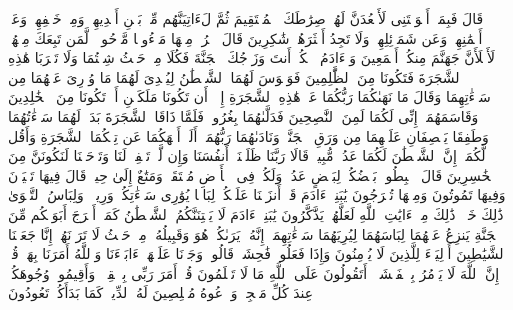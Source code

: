 \startbuffer[\q:7:16]
قَالَ فَبِمَاۤ أَغۡوَیۡتَنِی لَأَقۡعُدَنَّ لَهُمۡ صِرَٰطَكَ ٱلۡمُسۡتَقِیمَ%
\stopbuffer%
\startbuffer[\q:7:17]
ثُمَّ لَءَاتِیَنَّهُم مِّنۢ بَیۡنِ أَیۡدِیهِمۡ وَمِنۡ خَلۡفِهِمۡ وَعَنۡ أَیۡمَٰنِهِمۡ وَعَن شَمَاۤئِلِهِمۡۖ وَلَا تَجِدُ أَكۡثَرَهُمۡ شَٰكِرِینَ%
\stopbuffer%
\startbuffer[\q:7:18]
قَالَ ٱخۡرُجۡ مِنۡهَا مَذۡءُومࣰا مَّدۡحُورࣰاۖ لَّمَن تَبِعَكَ مِنۡهُمۡ لَأَمۡلَأَنَّ جَهَنَّمَ مِنكُمۡ أَجۡمَعِینَ%
\stopbuffer%
\startbuffer[\q:7:19]
وَیَٰۤءَادَمُ ٱسۡكُنۡ أَنتَ وَزَوۡجُكَ ٱلۡجَنَّةَ فَكُلَا مِنۡ حَیۡثُ شِئۡتُمَا وَلَا تَقۡرَبَا هَٰذِهِ ٱلشَّجَرَةَ فَتَكُونَا مِنَ ٱلظَّٰلِمِینَ%
\stopbuffer%
\startbuffer[\q:7:20]
فَوَسۡوَسَ لَهُمَا ٱلشَّیۡطَٰنُ لِیُبۡدِیَ لَهُمَا مَا وُۥرِیَ عَنۡهُمَا مِن سَوۡءَٰتِهِمَا وَقَالَ مَا نَهَىٰكُمَا رَبُّكُمَا عَنۡ هَٰذِهِ ٱلشَّجَرَةِ إِلَّاۤ أَن تَكُونَا مَلَكَیۡنِ أَوۡ تَكُونَا مِنَ ٱلۡخَٰلِدِینَ%
\stopbuffer%
\startbuffer[\q:7:21]
وَقَاسَمَهُمَاۤ إِنِّی لَكُمَا لَمِنَ ٱلنَّٰصِحِینَ%
\stopbuffer%
\startbuffer[\q:7:22]
فَدَلَّىٰهُمَا بِغُرُورࣲۚ فَلَمَّا ذَاقَا ٱلشَّجَرَةَ بَدَتۡ لَهُمَا سَوۡءَٰتُهُمَا وَطَفِقَا یَخۡصِفَانِ عَلَیۡهِمَا مِن وَرَقِ ٱلۡجَنَّةِۖ وَنَادَىٰهُمَا رَبُّهُمَاۤ أَلَمۡ أَنۡهَكُمَا عَن تِلۡكُمَا ٱلشَّجَرَةِ وَأَقُل لَّكُمَاۤ إِنَّ ٱلشَّیۡطَٰنَ لَكُمَا عَدُوࣱّ مُّبِینࣱ%
\stopbuffer%
\startbuffer[\q:7:23]
قَالَا رَبَّنَا ظَلَمۡنَاۤ أَنفُسَنَا وَإِن لَّمۡ تَغۡفِرۡ لَنَا وَتَرۡحَمۡنَا لَنَكُونَنَّ مِنَ ٱلۡخَٰسِرِینَ%
\stopbuffer%
\startbuffer[\q:7:24]
قَالَ ٱهۡبِطُوا۟ بَعۡضُكُمۡ لِبَعۡضٍ عَدُوࣱّۖ وَلَكُمۡ فِی ٱلۡأَرۡضِ مُسۡتَقَرࣱّ وَمَتَٰعٌ إِلَىٰ حِینࣲ%
\stopbuffer%
\startbuffer[\q:7:25]
قَالَ فِیهَا تَحۡیَوۡنَ وَفِیهَا تَمُوتُونَ وَمِنۡهَا تُخۡرَجُونَ%
\stopbuffer%
\startbuffer[\q:7:26]
یَٰبَنِیۤ ءَادَمَ قَدۡ أَنزَلۡنَا عَلَیۡكُمۡ لِبَاسࣰا یُوَٰرِی سَوۡءَٰتِكُمۡ وَرِیشࣰاۖ وَلِبَاسُ ٱلتَّقۡوَىٰ ذَٰلِكَ خَیۡرࣱۚ ذَٰلِكَ مِنۡ ءَایَٰتِ ٱللَّهِ لَعَلَّهُمۡ یَذَّكَّرُونَ%
\stopbuffer%
\startbuffer[\q:7:27]
یَٰبَنِیۤ ءَادَمَ لَا یَفۡتِنَنَّكُمُ ٱلشَّیۡطَٰنُ كَمَاۤ أَخۡرَجَ أَبَوَیۡكُم مِّنَ ٱلۡجَنَّةِ یَنزِعُ عَنۡهُمَا لِبَاسَهُمَا لِیُرِیَهُمَا سَوۡءَٰتِهِمَاۤۚ إِنَّهُۥ یَرَىٰكُمۡ هُوَ وَقَبِیلُهُۥ مِنۡ حَیۡثُ لَا تَرَوۡنَهُمۡۗ إِنَّا جَعَلۡنَا ٱلشَّیَٰطِینَ أَوۡلِیَاۤءَ لِلَّذِینَ لَا یُؤۡمِنُونَ%
\stopbuffer%
\startbuffer[\q:7:28]
وَإِذَا فَعَلُوا۟ فَٰحِشَةࣰ قَالُوا۟ وَجَدۡنَا عَلَیۡهَاۤ ءَابَاۤءَنَا وَٱللَّهُ أَمَرَنَا بِهَاۗ قُلۡ إِنَّ ٱللَّهَ لَا یَأۡمُرُ بِٱلۡفَحۡشَاۤءِۖ أَتَقُولُونَ عَلَى ٱللَّهِ مَا لَا تَعۡلَمُونَ%
\stopbuffer%
\startbuffer[\q:7:29]
قُلۡ أَمَرَ رَبِّی بِٱلۡقِسۡطِۖ وَأَقِیمُوا۟ وُجُوهَكُمۡ عِندَ كُلِّ مَسۡجِدࣲ وَٱدۡعُوهُ مُخۡلِصِینَ لَهُ ٱلدِّینَۚ كَمَا بَدَأَكُمۡ تَعُودُونَ%
